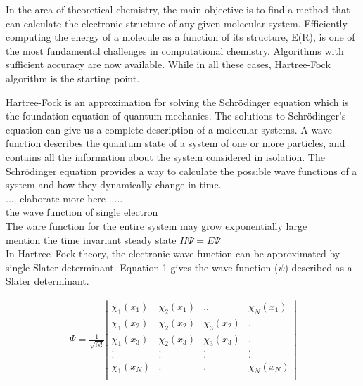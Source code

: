 \documentclass[twoside]{article}
\begin{document}
In the area of theoretical chemistry, the main objective is to find a method that can calculate the electronic structure of any given molecular system. Efficiently computing the energy of a molecule as a function of its structure, E(R), is one of the most fundamental challenges in computational chemistry. Algorithms with sufficient accuracy are now available. While in all these cases, Hartree-Fock algorithm is the starting point.

Hartree-Fock is an approximation for solving the Schrödinger equation 
which is the foundation equation of quantum mechanics.
The solutions to Schr\"{o}dinger's equation can give us a complete description of a molecular systems.
A wave function describes the quantum state of a system of one or more particles, and contains all the information about the system considered in isolation.
The Schrödinger equation provides a way to calculate the possible wave functions of a system and how they dynamically change in time. \\



.... elaborate more here .....  \\
the wave function of single electron \\
The ware function for the entire system may grow exponentially large\\
mention the time invariant steady state $H\Psi = E\Psi$ \\

In Hartree–Fock theory, the electronic wave function can be approximated by single Slater determinant.
Equation 1 gives the wave function ($\psi$) described as a Slater determinant. 

\begin{eqnarray}
\Psi=
\frac{1}{\sqrt{N!}}\left|
\begin{array}{cccc}
\chi_1(x_1)&\chi_2(x_1)&..&\chi_N(x_1)\\
\chi_1(x_2)&\chi_2(x_2)&\chi_3(x_2)&.\\
\chi_1(x_3)&\chi_2(x_3)&\chi_3(x_3)&.\\
.&.&.&.\\
.&.&.&.\\
\chi_1(x_N)&.&.&\chi_N(x_N)\\
\end{array}
\right|
\end{eqnarray}
\end{document}
